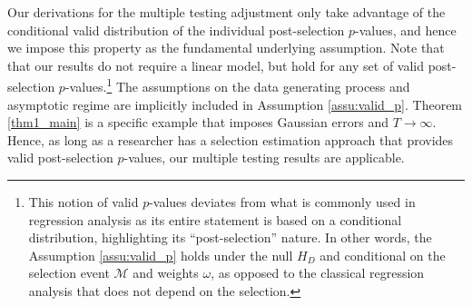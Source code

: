 \documentclass[11pt]{article}
\def\cmt#1{{\textcolor{red}{(#1)}}}
\begin{document}
Our derivations for the multiple testing adjustment only take advantage of the conditional valid distribution of the individual post-selection $p$-values, and hence we impose this property as the fundamental underlying assumption. Note that that our results do not require a linear model, but hold for any set of valid post-selection $p$-values.\footnote{This notion of valid $p$-values deviates from what is commonly used in regression analysis as its entire statement is based on a conditional distribution, highlighting its ``post-selection'' nature. In other words, the Assumption \ref{assu:valid_p} holds under the null $H_D$ and conditional on the selection event $\mathcal{M}$ and weights $\omega$, as opposed to the classical regression analysis that does not depend on the selection.} The assumptions on the data generating process and asymptotic regime are implicitly included in Assumption \ref{assu:valid_p}. Theorem \ref{thm1_main} is a specific example that imposes Gaussian errors and $T \rightarrow \infty$. Hence, as long as a researcher has a selection estimation approach that provides valid post-selection $p$-values, our multiple testing results are applicable. 






\end{document}
